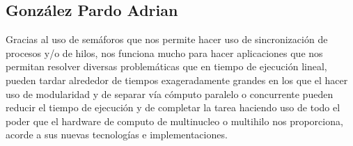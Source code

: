 \documentclass[11pt,a4paper]{article}
\begin{document}
\subsection{González Pardo Adrian}
Gracias al uso de semáforos que nos permite hacer uso de sincronización de procesos y/o de  hilos, nos funciona mucho para hacer aplicaciones que nos permitan resolver diversas problemáticas que en tiempo de ejecución lineal, pueden tardar alrededor de tiempos exageradamente grandes en los que el hacer uso de modularidad y de separar vía cómputo paralelo o concurrente pueden reducir el tiempo de ejecución y de completar la tarea haciendo uso de todo el poder que el hardware de computo de multinucleo o multihilo nos proporciona, acorde a sus nuevas tecnologías e implementaciones.
\end{document}
